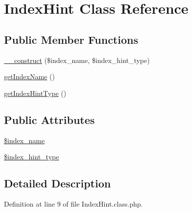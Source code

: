 \hypertarget{classIndexHint}{\section{Index\-Hint Class Reference}
\label{classIndexHint}
}
\subsection*{Public Member Functions}
\begin{DoxyCompactItemize}
\item 
\hyperlink{classIndexHint_a59b7fa3163cd01847fb3eccc57db0da8}{\-\_\-\-\_\-construct} (\$index\-\_\-name, \$index\-\_\-hint\-\_\-type)
\item 
\hyperlink{classIndexHint_a2e70ba0a6a8059eacec611a6e3a1fbff}{get\-Index\-Name} ()
\item 
\hyperlink{classIndexHint_afcf5b8d00ff142f4f1328c434ee5f344}{get\-Index\-Hint\-Type} ()
\end{DoxyCompactItemize}
\subsection*{Public Attributes}
\begin{DoxyCompactItemize}
\item 
\hyperlink{classIndexHint_a72e2ec1c8ae97c974642bf4342febc60}{\$index\-\_\-name}
\item 
\hyperlink{classIndexHint_a04d23166dfd4b7490a69b678e2826a32}{\$index\-\_\-hint\-\_\-type}
\end{DoxyCompactItemize}


\subsection{Detailed Description}


Definition at line 9 of file Index\-Hint.\-class.\-php.



